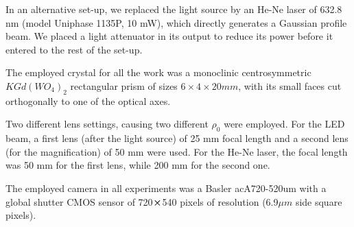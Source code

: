 \documentclass[11pt, a4paper, twoside]{article} %
\begin{document}
In an alternative set-up, we replaced the light source by an He-Ne laser of 632.8 nm (model Uniphase 1135P, 10 mW), which directly generates a Gaussian profile beam. We placed a light attenuator in its output to reduce its power before it entered to the rest of the set-up.


The employed crystal for all the work was a monoclinic centrosymmetric $KGd(WO_4)_2$ rectangular prism of sizes $6\times4\times20mm$, with its small faces cut orthogonally to one of the optical axes.\vspace{-0.1cm}

Two different lens settings, causing two different $\rho_0$ were employed. For the LED beam, a first lens (after the light source) of 25 mm focal length and a second lens (for the magnification) of 50 mm were used. For the He-Ne laser, the focal length was 50 mm for the first lens, while 200 mm for the second one.\vspace{-0.1cm}

The employed camera in all experiments was a Basler acA720-520um with a global shutter CMOS sensor of 720$\cross$540 pixels of resolution (6.9$\mu m$ side square pixels). 


%
%
%
%
%
%
%
%
%
%
%
%
%
%
% 
%
 
\end{document}
